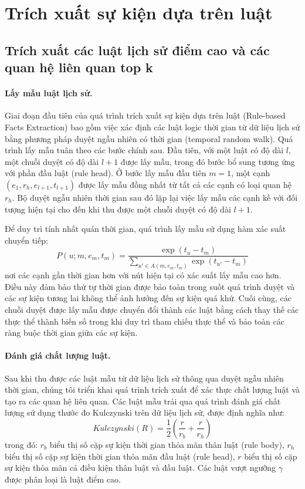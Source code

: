 \section{Trích xuất sự kiện dựa trên luật}

\subsection{Trích xuất các luật lịch sử điểm cao và các quan hệ liên quan top k}

\paragraph{Lấy mẫu luật lịch sử.}
Giai đoạn đầu tiên của quá trình trích xuất sự kiện dựa trên luật (Rule-based Facts Extraction) bao gồm việc xác định các luật logic thời gian từ dữ liệu lịch sử bằng phương pháp duyệt ngẫu nhiên có thời gian (temporal random walk). Quá trình lấy mẫu tuân theo các bước chính sau. Đầu tiên, với một luật có độ dài \( l \), một chuỗi duyệt có độ dài \( l+1 \) được lấy mẫu, trong đó bước bổ sung tương ứng với phần đầu luật (rule head). Ở bước lấy mẫu đầu tiên \( m = 1 \), một cạnh \( (e_1, r_h, e_{l+1}, t_{l+1}) \) được lấy mẫu đồng nhất từ tất cả các cạnh có loại quan hệ \( r_h \). Bộ duyệt ngẫu nhiên thời gian sau đó lặp lại việc lấy mẫu các cạnh kề với đối tượng hiện tại cho đến khi thu được một chuỗi duyệt có độ dài \( l+1 \).

Để duy trì tính nhất quán thời gian, quá trình lấy mẫu sử dụng hàm xác suất chuyển tiếp:
\begin{equation}
    \tag{2}
    \label{eq2}
    P(u; m, e_m, t_m) = \frac{\exp(t_u - t_m)}{\sum_{u' \in A(m, e_m, t_m)} \exp(t_{u'} - t_m)}
\end{equation}
nơi các cạnh gần thời gian hơn với nút hiện tại có xác suất lấy mẫu cao hơn. Điều này đảm bảo thứ tự thời gian được bảo toàn trong suốt quá trình duyệt và các sự kiện tương lai không thể ảnh hưởng đến sự kiện quá khứ. Cuối cùng, các chuỗi duyệt được lấy mẫu được chuyển đổi thành các luật bằng cách thay thế các thực thể thành biến số trong khi duy trì tham chiếu thực thể và bảo toàn các ràng buộc thời gian giữa các sự kiện.

\paragraph{Đánh giá chất lượng luật.}
Sau khi thu được các luật mẫu từ dữ liệu lịch sử thông qua duyệt ngẫu nhiên thời gian, chúng tôi triển khai quá trình trích xuất để xác thực chất lượng luật và tạo ra các quan hệ liên quan. Các luật mẫu trải qua quá trình đánh giá chất lượng sử dụng thước đo Kulczynski trên dữ liệu lịch sử, được định nghĩa như:
\begin{equation}
\tag{3}
\label{eq3}
    Kulczynski(R) = \frac{1}{2} \left( \frac{r}{r_b} + \frac{r}{r_h} \right)
\end{equation}
trong đó: \( r_b \) biểu thị số cặp sự kiện thời gian thỏa mãn thân luật (rule body), \( r_h \) biểu thị số cặp sự kiện thời gian thỏa mãn đầu luật (rule head), \( r \) biểu thị số cặp sự kiện thỏa mãn cả điều kiện thân luật và đầu luật. Các luật vượt ngưỡng \( \gamma \) được phân loại là luật điểm cao.

